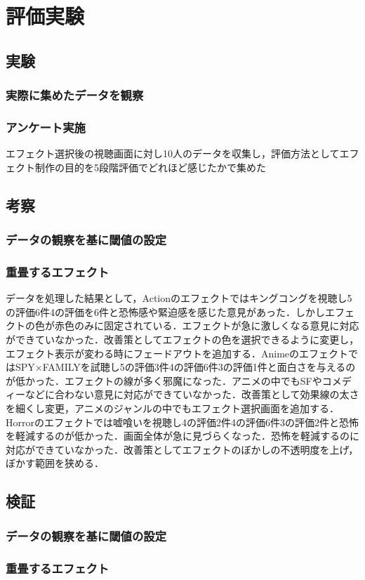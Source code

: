 \thispagestyle{myheadings}
\chapter{評価実験}

\section{実験}
\subsection{実際に集めたデータを観察}
\subsection{アンケート実施}
エフェクト選択後の視聴画面に対し10人のデータを収集し，評価方法としてエフェクト制作の目的を5段階評価でどれほど感じたかで集めた

\section{考察}
\subsection{データの観察を基に閾値の設定}
\subsection{重畳するエフェクト}
データを処理した結果として，Actionのエフェクトではキングコングを視聴し5の評価6件4の評価を6件と恐怖感や緊迫感を感じた意見があった．しかしエフェクトの色が赤色のみに固定されている．エフェクトが急に激しくなる意見に対応ができていなかった．改善策としてエフェクトの色を選択できるように変更し，エフェクト表示が変わる時にフェードアウトを追加する．AnimeのエフェクトではSPY×FAMILYを試聴し5の評価3件4の評価6件3の評価1件と面白さを与えるのが低かった．エフェクトの線が多く邪魔になった．アニメの中でもSFやコメディーなどに合わない意見に対応ができていなかった．改善策として効果線の太さを細くし変更，アニメのジャンルの中でもエフェクト選択画面を追加する．Horrorのエフェクトでは嘘喰いを視聴し4の評価2件4の評価6件3の評価2件と恐怖を軽減するのが低かった．画面全体が急に見づらくなった．恐怖を軽減するのに対応ができていなかった．改善策としてエフェクトのぼかしの不透明度を上げ，ぼかす範囲を狭める．

\section{検証}
\subsection{データの観察を基に閾値の設定}
\subsection{重畳するエフェクト}